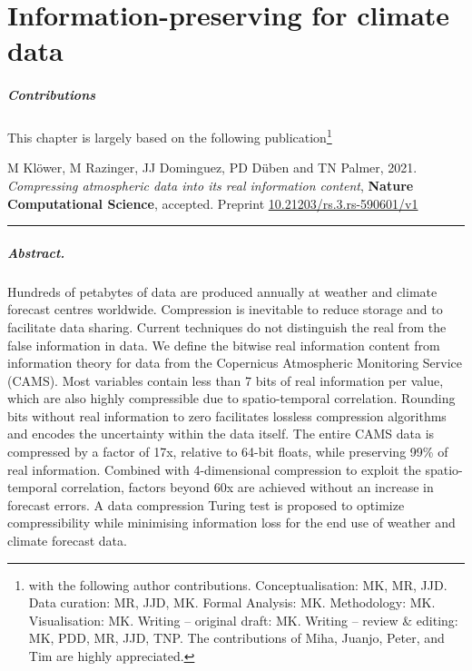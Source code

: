 \chapter{Information-preserving  for climate data}
\label{chap:compression}

\small \paragraph{Contributions} This chapter is largely based on the following publication\footnote{with the following author contributions.
Conceptualisation: MK, MR, JJD. Data curation: MR, JJD, MK. Formal Analysis: MK. Methodology: MK. Visualisation: MK. Writing –
original draft: MK. Writing – review \& editing: MK, PDD, MR, JJD, TNP. The contributions of Miha, Juanjo, Peter, and Tim are highly
appreciated.}

\vspace{\baselineskip}
\indent M Klöwer, M Razinger, JJ Dominguez, PD Düben and TN Palmer, 2021. \emph{Compressing atmospheric data into its real
information content}, \textbf{Nature Computational Science}, accepted. Preprint \href{https://doi.org/10.21203/rs.3.rs-590601/v1}{10.21203/rs.3.rs-590601/v1}
\vspace{\baselineskip}
\hrule
\vspace{\baselineskip}
\normalsize

\paragraph{Abstract.} Hundreds of petabytes of data are produced annually at weather and climate forecast centres worldwide.
Compression is inevitable to reduce storage and to facilitate data sharing. Current techniques do not distinguish the real from
the false information in data. We define the bitwise real information content from information theory for data from the Copernicus
Atmospheric Monitoring Service (CAMS). Most variables contain less than 7 bits of real information per value, which are also highly
compressible due to spatio-temporal correlation. Rounding bits without real information to zero facilitates lossless compression
algorithms and encodes the uncertainty within the data itself. The entire CAMS data is compressed by a factor of 17x, relative to
64-bit floats, while preserving 99\% of real information. Combined with 4-dimensional compression to exploit the spatio-temporal
correlation, factors beyond 60x are achieved without an increase in forecast errors. A data compression Turing test is proposed to
optimize compressibility while minimising information loss for the end use of weather and climate forecast data. 

